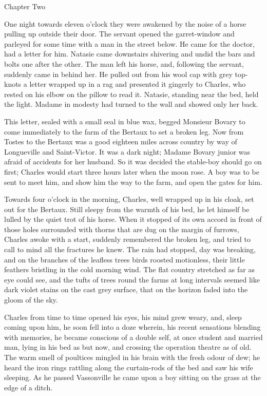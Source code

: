 \documentclass[11pt,twocolumn]{ltugboat}
\begin{document}
Chapter Two

One night towards eleven o'clock they were awakened by the noise of
a horse pulling up outside their door. The servant opened the
garret-window and parleyed for some time with a man in the street below.
He came for the doctor, had a letter for him. Natasie came downstairs
shivering and undid the bars and bolts one after the other. The man left
his horse, and, following the servant, suddenly came in behind her. He
pulled out from his wool cap with grey top-knots a letter wrapped up in
a rag and presented it gingerly to Charles, who rested on his elbow on
the pillow to read it. Natasie, standing near the bed, held the light.
Madame in modesty had turned to the wall and showed only her back.

This letter, sealed with a small seal in blue wax, begged Monsieur
Bovary to come immediately to the farm of the Bertaux to set a broken
leg. Now from Tostes to the Bertaux was a good eighteen miles across
country by way of Longueville and Saint-Victor. It was a dark night;
Madame Bovary junior was afraid of accidents for her husband. So it was
decided the stable-boy should go on first; Charles would start three
hours later when the moon rose. A boy was to be sent to meet him, and
show him the way to the farm, and open the gates for him.

Towards four o'clock in the morning, Charles, well wrapped up in his
cloak, set out for the Bertaux. Still sleepy from the warmth of his bed,
he let himself be lulled by the quiet trot of his horse. When it stopped
of its own accord in front of those holes surrounded with thorns that
are dug on the margin of furrows, Charles awoke with a start, suddenly
remembered the broken leg, and tried to call to mind all the fractures
he knew. The rain had stopped, day was breaking, and on the branches
of the leafless trees birds roosted motionless, their little feathers
bristling in the cold morning wind. The flat country stretched as far as
eye could see, and the tufts of trees round the farms at long intervals
seemed like dark violet stains on the cast grey surface, that on the
horizon faded into the gloom of the sky.

Charles from time to time opened his eyes, his mind grew weary, and,
sleep coming upon him, he soon fell into a doze wherein, his recent
sensations blending with memories, he became conscious of a double
self, at once student and married man, lying in his bed as but now, and
crossing the operation theatre as of old. The warm smell of poultices
mingled in his brain with the fresh odour of dew; he heard the iron
rings rattling along the curtain-rods of the bed and saw his wife
sleeping. As he passed Vassonville he came upon a boy sitting on the
grass at the edge of a ditch.
\end{document}
